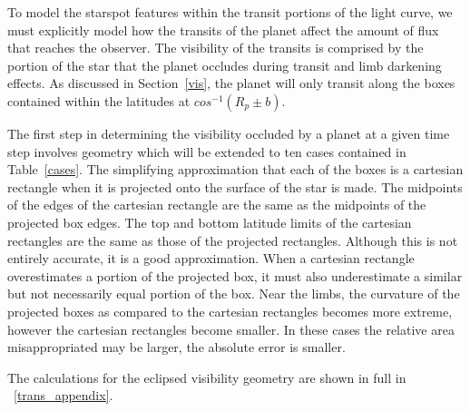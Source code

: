 To model the starspot features within the transit portions of the light curve, we must explicitly model how the transits of the planet affect the amount of flux that reaches the observer. The visibility of the transits is comprised by the portion of the star that the planet occludes during transit and limb darkening effects. As discussed in Section~\ref{vis}, the planet will only transit along the boxes contained within the latitudes at $cos^{-1}(R_p \pm b)$. 
 
The first step in determining the visibility occluded by a planet at a given time step involves geometry which will be extended to ten cases contained in Table~\ref{cases}. The simplifying approximation that each of the boxes is a cartesian rectangle when it is projected onto the surface of the star is made. The midpoints of the edges of the cartesian rectangle are the same as the midpoints of the projected box edges. The top and bottom latitude limits of the cartesian rectangles are the same as those of the projected rectangles. Although this is not entirely accurate, it is a good approximation.  When a cartesian rectangle overestimates a portion of the projected box, it must also underestimate a similar but not necessarily equal portion of the box. Near the limbs, the curvature of the projected boxes as compared to the cartesian rectangles becomes more extreme, however the cartesian rectangles become smaller. In these cases the relative area misappropriated may be larger, the absolute error is smaller.

The calculations for the eclipsed visibility geometry are shown in full in ~\ref{trans_appendix}.


